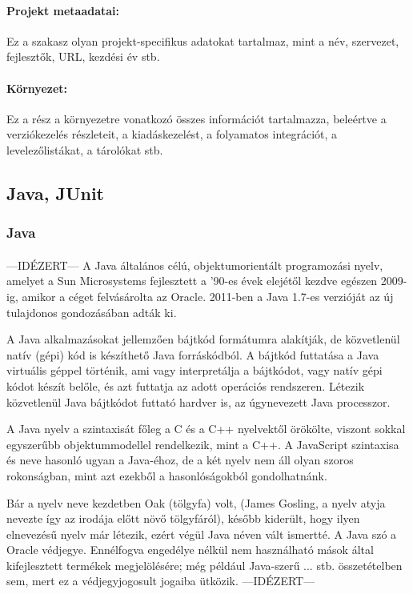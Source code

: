 \paragraph{Projekt metaadatai:} Ez a szakasz olyan projekt-specifikus adatokat tartalmaz, mint a név,
szervezet, fejlesztők, URL, kezdési év stb.
\paragraph{Környezet:} Ez a rész a környezetre vonatkozó összes információt tartalmazza, beleértve a verziókezelés részleteit, a kiadáskezelést, a folyamatos integrációt, a levelezőlistákat, a tárolókat stb.

\pagebreak

\subsection{Java, JUnit}

\subsubsection{Java}
\paragraph{}
---IDÉZERT---
A Java általános célú, objektumorientált programozási nyelv, amelyet a Sun Microsystems fejlesztett a ’90-es évek elejétől kezdve egészen 2009-ig, amikor a céget felvásárolta az Oracle. 2011-ben a Java 1.7-es verzióját az új tulajdonos gondozásában adták ki.

A Java alkalmazásokat jellemzően bájtkód formátumra alakítják, de közvetlenül natív (gépi) kód is készíthető Java forráskódból. A bájtkód futtatása a Java virtuális géppel történik, ami vagy interpretálja a bájtkódot, vagy natív gépi kódot készít belőle, és azt futtatja az adott operációs rendszeren. Létezik közvetlenül Java bájtkódot futtató hardver is, az úgynevezett Java processzor.

A Java nyelv a szintaxisát főleg a C és a C++ nyelvektől örökölte, viszont sokkal egyszerűbb objektummodellel rendelkezik, mint a C++. A JavaScript szintaxisa és neve hasonló ugyan a Java-éhoz, de a két nyelv nem áll olyan szoros rokonságban, mint azt ezekből a hasonlóságokból gondolhatnánk.

Bár a nyelv neve kezdetben Oak (tölgyfa) volt, (James Gosling, a nyelv atyja nevezte így az irodája előtt növő tölgyfáról), később kiderült, hogy ilyen elnevezésű nyelv már létezik, ezért végül Java néven vált ismertté. A Java szó a Oracle védjegye. Ennélfogva engedélye nélkül nem használható mások által kifejlesztett termékek megjelölésére; még például Java-szerű ... stb. összetételben sem, mert ez a védjegyjogosult jogaiba ütközik.
---IDÉZERT---

